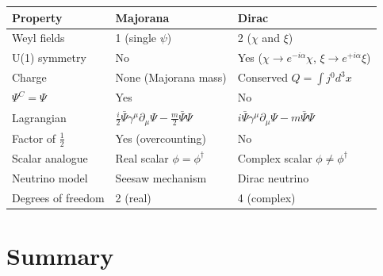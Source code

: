 \documentclass[12pt]{article}
\begin{document}
\begin{center}
\renewcommand{\arraystretch}{1.5}
\begin{tabular}{@{}lll@{}}
  \toprule
  \textbf{Property} & \textbf{Majorana} & \textbf{Dirac} \\
  \midrule
  Weyl fields & 1 (single $\psi$) & 2 ($\chi$ and $\xi$) \\
  U(1) symmetry & No & Yes ($\chi\to e^{-i\alpha}\chi$, $\xi\to e^{+i\alpha}\xi$) \\
  Charge & None (Majorana mass) & Conserved $Q=\int j^0 d^3x$ \\
  $\Psi^C = \Psi$ & Yes & No \\
  Lagrangian & $\frac{i}{2}\bar{\Psi}\gamma^\mu\partial_\mu\Psi - \frac{m}{2}\bar{\Psi}\Psi$ &
               $i\bar{\Psi}\gamma^\mu\partial_\mu\Psi - m\bar{\Psi}\Psi$ \\
  Factor of $\frac{1}{2}$ & Yes (overcounting) & No \\
  Scalar analogue & Real scalar $\phi=\phi^\dagger$ & Complex scalar $\phi\neq\phi^\dagger$ \\
  Neutrino model & Seesaw mechanism & Dirac neutrino \\
  Degrees of freedom & 2 (real) & 4 (complex) \\
  \bottomrule
\end{tabular}
\end{center}

\section{Summary}
\end{document}
